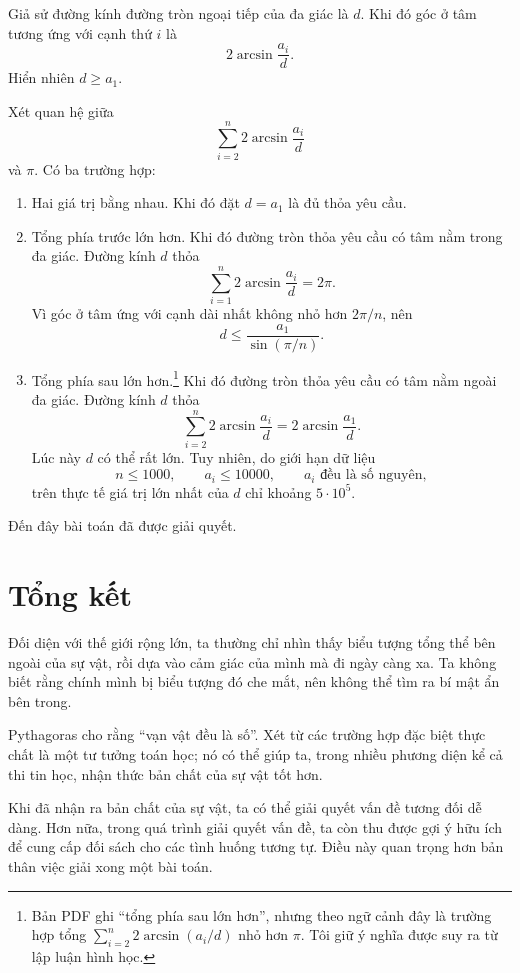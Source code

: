 \documentclass[11pt]{article}
\begin{document}
Giả sử đường kính đường tròn ngoại tiếp của đa giác là \(d\). Khi đó góc ở tâm
tương ứng với cạnh thứ \(i\) là
\[
  2\arcsin\frac{a_i}{d}.
\]
Hiển nhiên \(d\ge a_1\).

Xét quan hệ giữa
\[
  \sum_{i=2}^{n}2\arcsin\frac{a_i}{d}
\]
và \(\pi\). Có ba trường hợp:
\begin{enumerate}
  \item Hai giá trị bằng nhau. Khi đó đặt \(d=a_1\) là đủ thỏa yêu cầu.
  \item Tổng phía trước lớn hơn. Khi đó đường tròn thỏa yêu cầu có tâm nằm
  trong đa giác. Đường kính \(d\) thỏa
  \[
    \sum_{i=1}^{n}2\arcsin\frac{a_i}{d}=2\pi.
  \]
  Vì góc ở tâm ứng với cạnh dài nhất không nhỏ hơn \(2\pi/n\), nên
  \[
    d\le \frac{a_1}{\sin(\pi/n)}.
  \]
  \item Tổng phía sau lớn hơn.\footnote{Bản PDF ghi ``tổng phía sau
  lớn hơn'', nhưng theo ngữ cảnh đây là trường hợp tổng
  \(\sum_{i=2}^{n}2\arcsin(a_i/d)\) nhỏ hơn \(\pi\). Tôi giữ ý nghĩa được suy
  ra từ lập luận hình học.} Khi đó đường tròn thỏa yêu cầu có tâm nằm ngoài đa
  giác. Đường kính \(d\) thỏa
  \[
    \sum_{i=2}^{n}2\arcsin\frac{a_i}{d}
    =2\arcsin\frac{a_1}{d}.
  \]
  Lúc này \(d\) có thể rất lớn. Tuy nhiên, do giới hạn dữ liệu
  \[
    n\le 1000,\qquad a_i\le 10000,\qquad a_i\text{ đều là số nguyên},
  \]
  trên thực tế giá trị lớn nhất của \(d\) chỉ khoảng \(5\cdot 10^5\).
\end{enumerate}

Đến đây bài toán đã được giải quyết.

\section{Tổng kết}

Đối diện với thế giới rộng lớn, ta thường chỉ nhìn thấy biểu tượng tổng thể
bên ngoài của sự vật, rồi dựa vào cảm giác của mình mà đi ngày càng xa. Ta
không biết rằng chính mình bị biểu tượng đó che mắt, nên không thể tìm ra bí
mật ẩn bên trong.

Pythagoras cho rằng ``vạn vật đều là số''. Xét từ các trường hợp đặc biệt thực
chất là một tư tưởng toán học; nó có thể giúp ta, trong nhiều phương diện kể
cả thi tin học, nhận thức bản chất của sự vật tốt hơn.

Khi đã nhận ra bản chất của sự vật, ta có thể giải quyết vấn đề tương đối dễ
dàng. Hơn nữa, trong quá trình giải quyết vấn đề, ta còn thu được gợi ý hữu
ích để cung cấp đối sách cho các tình huống tương tự. Điều này quan trọng hơn
bản thân việc giải xong một bài toán.
\end{document}
